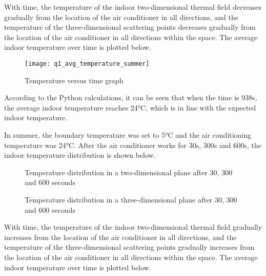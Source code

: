\documentclass{apmcmthesis}
\begin{document}
With time, the temperature of the indoor two-dimensional thermal field decreases gradually from the location of the air conditioner in all directions, and the temperature of the three-dimensional scattering points decreases gradually from the location of the air conditioner in all directions within the space. The average indoor temperature over time is plotted below.
\begin{figure}[H]
	\centering
	\texttt{[image: q1\_avg\_temperature\_summer]}%
	\caption{Temperature versus time graph} %
\end{figure}

According to the Python calculations, it can be seen that when the time is 938s, the average indoor temperature reaches 24°C, which is in line with the expected indoor temperature.

In summer, the boundary temperature was set to 5°C and the air conditioning temperature was 24°C. After the air conditioner works for 30s, 300s and 600s, the indoor temperature distribution is shown below.

\begin{figure}[H]
	\centering    
	\caption{Temperature distribution in a two-dimensional plane after 30, 300 and 600 seconds}		%
\end{figure}
\begin{figure}[H]
	\centering    
	\caption{Temperature distribution in a three-dimensional plane after 30, 300 and 600 seconds}		%
\end{figure}
With time, the temperature of the indoor two-dimensional thermal field gradually increases from the location of the air conditioner in all directions, and the temperature of the three-dimensional scattering points gradually increases from the location of the air conditioner in all directions within the space. The average indoor temperature over time is plotted below.
\end{document}
